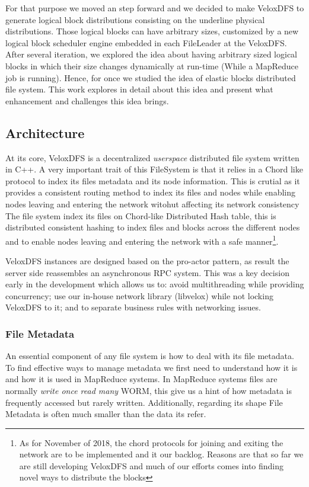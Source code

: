 For that purpose we moved an step forward and we decided to make VeloxDFS to generate logical block distributions consisting on the underline physical distributions. Those logical blocks can have arbitrary sizes, customized by a new logical block scheduler engine embedded in each FileLeader at the VeloxDFS. \\

After several iteration, we explored the idea about having arbitrary sized logical blocks in which their size changes dynamically at run-time (While a MapReduce job is running). Hence, for once we studied the idea of elastic blocks distributed file system. This work explores in detail about this idea and present what enhancement and challenges this idea brings.


\subsection{Architecture}
At its core, VeloxDFS is a decentralized \textit{userspace} distributed file system written in C++. 
A very important trait of this FileSystem is that it relies in a Chord like protocol to index its files metadata and its node information.
This is crutial as it provides a consistent routing method to index its files and nodes while enabling nodes leaving and entering the network witohut affecting its network consistency 
The file system index its files on Chord-like Distributed Hash table, this is distributed consistent hashing to index files and blocks across the different nodes and to enable nodes leaving and entering the network with a safe manner\footnote{As for November of 2018, the chord protocols for joining and exiting the network are to be implemented and it our backlog. Reasons are that so far we are still developing VeloxDFS and much of our efforts comes into finding novel ways to distribute the blocks}.

VeloxDFS instances are designed based on the pro-actor pattern, as result the server side reassembles an asynchronous RPC system. This was a key decision early in the development which allows us to: avoid multithreading while providing concurrency; use our in-house network library (libvelox) while not locking VeloxDFS to it; and to separate business rules with networking issues. \\

\subsubsection{File Metadata}
An essential component of any file system is how to deal with its file metadata. To find effective ways to manage metadata we first need to understand how it is and how it is used in MapReduce systems. In MapReduce systems files are normally \textit{write once read many} WORM, this give us a hint of how metadata is frequently accessed but rarely written. Additionally, regarding its shape File Metadata is often much smaller than the data its refer.\\ 

